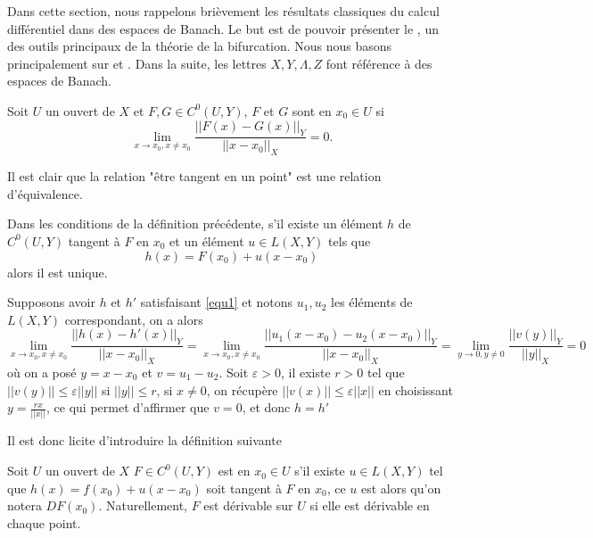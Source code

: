 \documentclass[memoire.tex]{subfiles}
\begin{document}
Dans cette section, nous rappelons brièvement les résultats classiques du calcul différentiel dans des espaces de Banach. Le but est de pouvoir présenter le , un des outils principaux de la théorie de la bifurcation. Nous nous basons principalement sur \cite{dieudonne1969fma8} et \cite{coleman2012calculus}. Dans la suite, les lettres $X,Y,\Lambda,Z$ font référence à des espaces de Banach.

\begin{definition}
Soit $U$ un ouvert de $X$ et $F,G\in C^0(U,Y)$, $F$ et $G$ sont  en $x_0\in U$ si 
\begin{equation*}
    \lim_{x\rightarrow{x_0},x\neq x_0}  \frac{||F(x)-G(x)||_Y}{||x-x_0||_X}=0.
\end{equation*}
\end{definition}
Il est clair que la relation "être tangent en un point" est une relation d'équivalence.
\begin{lemme}\label{Lemme-unicité}
Dans les conditions de la définition précédente, s'il existe un élément $h$ de $C^0(U,Y)$ tangent à $F$ en $x_0$ et un élément  $u\in L(X,Y)$ tels que
\begin{equation}\label{equ1}
    h(x)=F(x_0)+u(x-x_0)
\end{equation}
alors il est unique.
\end{lemme}
\begin{preuve}
   Supposons avoir $h$ et $h'$ satisfaisant \eqref{equ1} et notons $u_1,u_2$ les éléments de $L(X,Y)$ correspondant, on a alors 
   \begin{equation*}
           \lim_{x\rightarrow{x_0},x\neq x_0}  \frac{||h(x)-h'(x)||_Y}{||x-x_0||_X}
           = \lim_{x\rightarrow{x_0},x\neq x_0}  \frac{||u_1(x-x_0)-u_2(x-x_0)||_Y}{||x-x_0||_X}
           =           \lim_{y\rightarrow{0},y\neq 0}  \frac{||v(y)||_Y}{||y||_X}=0
   \end{equation*}
   où on a posé $y=x-x_0$ et $v=u_1-u_2$. Soit $\varepsilon>0$, il existe $r>0$ tel que $||v(y)||\leq \varepsilon||y||$ si $||y||\leq r$, si $x\neq 0$, on récupère $||v(x)||\leq \varepsilon  ||x||$ en choisissant $y=\frac{r x}{||x||}$, ce qui permet d'affirmer que $v=0$, et donc $h=h'$
\end{preuve}
Il est donc licite d'introduire la définition suivante
\begin{definition}
Soit $U$ un ouvert de $X$
$F\in C^0(U,Y)$ est  en $x_0\in U$ s'il existe $u\in L(X,Y)$ tel que  $h(x)=f(x_0)+u(x-x_0)$ soit tangent à $F$ en $x_0$, ce $u$ est alors  qu'on notera $DF(x_0)$. Naturellement, $F$ est dérivable sur $U$ si elle est dérivable en chaque point.
\end{definition}
\end{document}
